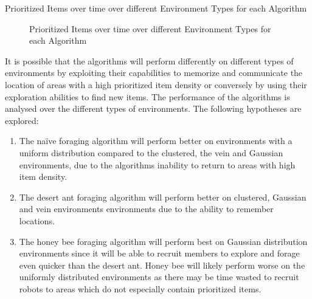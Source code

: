 \begin{table} [h]
     \caption{Prioritized Items over time over different Environment Types for each Algorithm}
     \label{ratio}
	\centering
	\footnotesize
	
\end{table}


\begin{figure}[!htb]
\centering
\resizebox{0.8\textwidth}{!}{}
\caption{Prioritized Items over time over different Environment Types for each Algorithm}
\label{environmenttypes}
\end{figure}


It is possible that the algorithms will perform differently on different types of environments by exploiting their capabilities to memorize and communicate the location of areas with a high prioritized item density or conversely by using their exploration abilities to find new items. The performance of the algorithms is analysed over the different types of environments. The following hypotheses are explored:  

\begin{enumerate}
	\item The na\"ive foraging algorithm will perform better on environments with a uniform distribution compared to the clustered, the vein and Gaussian environments, due to the algorithms inability to return to areas with high item density. 
	\item The desert ant foraging algorithm will perform better on clustered, Gaussian and vein environments environments due to the ability to remember locations.
	 \item The honey bee foraging algorithm will perform best on Gaussian distribution environments since it will be able to recruit members to explore and forage even quicker than the desert ant. Honey bee will likely perform worse on the uniformly distributed environments as there may be time wasted to recruit robots to areas which do not especially contain prioritized items.
\end{enumerate}

